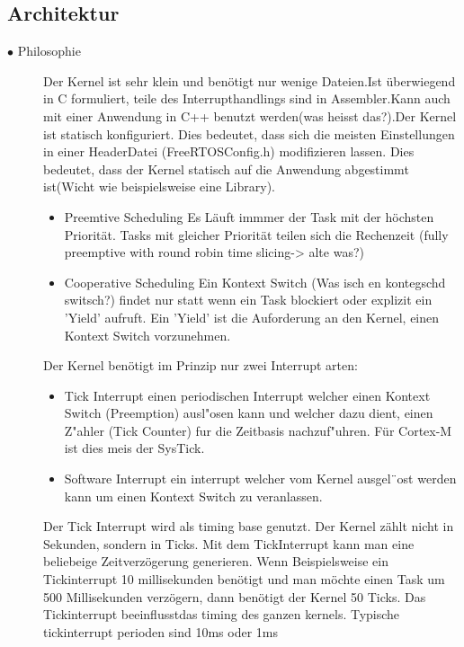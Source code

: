 \documentclass[a4paper, 8pt]{extarticle}
\begin{document}
\begin{multicols*}{3}
			\subsection{Architektur}
				\begin{description}
					\item[$\bullet$ Philosophie]
						Der Kernel ist sehr klein und benötigt nur wenige Dateien.Ist überwiegend in C formuliert, teile des Interrupthandlings
						sind in Assembler.Kann auch mit einer Anwendung in C++ benutzt werden(was heisst das?).Der Kernel ist statisch konfiguriert.
						Dies bedeutet, dass sich die meisten Einstellungen in einer HeaderDatei (FreeRTOSConfig.h) modifizieren lassen.	Dies bedeutet, dass der 
						Kernel statisch auf die Anwendung abgestimmt ist(Wicht wie beispielsweise eine Library).
						\begin{itemize}
							\item Preemtive Scheduling 
								Es Läuft immmer der Task mit der höchsten Priorität. Tasks mit gleicher Priorität teilen sich die Rechenzeit
								(fully preemptive with round robin time slicing-> alte was?) 
							\item Cooperative Scheduling 
								Ein Kontext Switch (Was isch en kontegschd switsch?) findet nur statt wenn ein Task blockiert oder explizit ein ’Yield’ aufruft. Ein ’Yield’ ist die Auforderung an
								den Kernel, einen Kontext Switch vorzunehmen.\\
						\end{itemize}
						Der Kernel benötigt im Prinzip nur zwei Interrupt arten:\\
						\begin{itemize}
							\item Tick Interrupt
								einen periodischen Interrupt welcher einen Kontext
								Switch (Preemption) ausl"osen kann und welcher dazu dient, einen Z"ahler
								(Tick Counter) fur die Zeitbasis nachzuf"uhren. Für Cortex-M ist dies meis der SysTick.
							\item Software Interrupt 
								ein interrupt welcher vom Kernel ausgel¨ost werden
								kann um einen Kontext Switch zu veranlassen.	 
						\end{itemize}
						Der Tick Interrupt wird als timing base genutzt. Der Kernel zählt nicht in Sekunden, sondern in Ticks. Mit dem TickInterrupt kann man eine
						beliebeige Zeitverzögerung generieren. Wenn Beispielsweise ein Tickinterrupt 10 millisekunden benötigt und man möchte einen Task um 500 Millisekunden 
						verzögern, dann benötigt der Kernel 50 Ticks. Das Tickinterrupt beeinflusstdas timing des ganzen kernels. Typische tickinterrupt perioden sind 10ms oder 1ms 

\end{description}
\end{multicols*}
\end{document}
